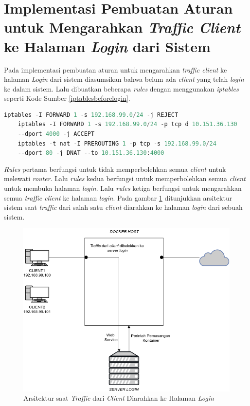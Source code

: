   \section{Implementasi Pembuatan Aturan untuk Mengarahkan \textit{Traffic Client} ke Halaman \textit{Login} dari Sistem}
  Pada implementasi pembuatan aturan untuk mengarahkan \textit{traffic client} ke halaman \textit{Login} dari sistem diasumsikan bahwa belum ada \textit{client} yang telah \textit{login} ke dalam sistem. Lalu dibuatkan beberapa \textit{rules} dengan menggunakan \textit{iptables} seperti Kode Sumber \ref{iptablesbeforelogin}. \\
  \begin{minipage}{\linewidth}
  	\begin{lstlisting}[caption=Command untuk mengarahkan \textit{client} ke halaman \textit{login},language=Python,label=iptablesbeforelogin]
  	iptables -I FORWARD 1 -s 192.168.99.0/24 -j REJECT
  	iptables -I FORWARD 1 -s 192.168.99.0/24 -p tcp d 10.151.36.130
  	--dport 4000 -j ACCEPT
  	iptables -t nat -I PREROUTING 1 -p tcp -s 192.168.99.0/24
  	--dport 80 -j DNAT --to 10.151.36.130:4000
  	\end{lstlisting}
  \end{minipage}
  
  \textit{Rules} pertama berfungsi untuk tidak memperbolehkan semua \textit{client} untuk melewati \textit{router}. Lalu \textit{rules} kedua berfungsi untuk memperbolehkan semua \textit{client} untuk membuka halaman \textit{login}. Lalu \textit{rules} ketiga berfungsi untuk mengarahkan semua \textit{traffic client} ke halaman \textit{login}. Pada gambar \ref{diagram2} ditunjukkan arsitektur sistem saat \textit{traffic} dari salah satu \textit{client} diarahkan ke halaman \textit{login} dari sebuah sistem.
  
  \begin{figure}[H]
  	\centering
  	\includegraphics[width=\linewidth]{images/bab4/DIAGRAM2}
  	\caption{Arsitektur saat \textit{Traffic} dari \textit{Client} Diarahkan ke Halaman \textit{Login}}
  	\label{diagram2}
  \end{figure} 
  

